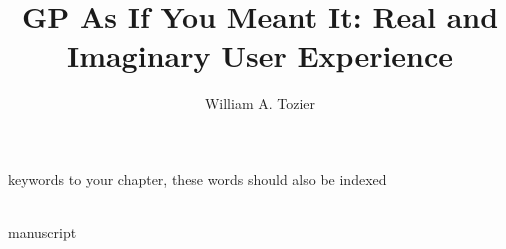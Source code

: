 %

\title*{GP As If You Meant It: Real and Imaginary User Experience}

\author{William A. Tozier}


\maketitle


\begin{keywords}
keywords to your chapter, these words should also be indexed
\end{keywords}
\\


{manuscript}






